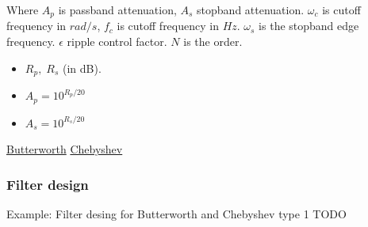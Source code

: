 \documentclass{article}
\begin{document}
Where $A_p$ is passband attenuation, $A_s$ stopband attenuation. 
$\omega_c$ is cutoff frequency in $rad/s$, $f_c$ is cutoff frequency in $Hz$.
$\omega_s$ is the stopband edge frequency. $\epsilon$ ripple control factor.
$N$ is the order.
\begin{itemize}
	\item $R_p, \; R_s$ (in dB). 
	\item $A_p=10^{R_p/20}$
	\item $A_s=10^{R_s/20}$
\end{itemize}

\href{https://en.wikipedia.org/wiki/Butterworth_filter}{Butterworth}
\href{https://www.semanticscholar.org/paper/Low-pass-filter-approximation-with-evolutionary-Ayten-Vural/447a00e54c1abb6e98ddf243a3de1cba33cd5200/figure/0}{Chebyshev}









\subsubsection{Filter design}
\begin{exampleblock}{Example: Filter desing for Butterworth and Chebyshev type 1}
	TODO
\end{exampleblock}
\end{document}

